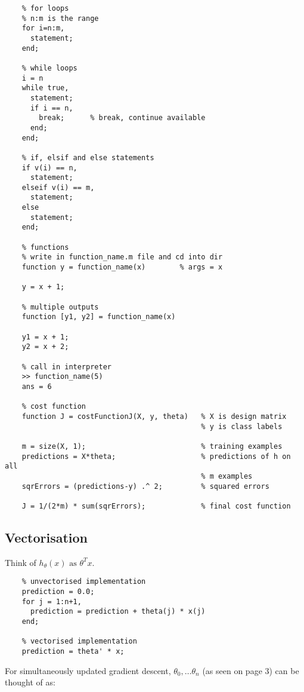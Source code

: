 \documentclass[12pt] {article}
\begin{document}
{    \begin{lstlisting}
    % for loops
    % n:m is the range
    for i=n:m,
      statement;
    end;

    % while loops
    i = n
    while true,
      statement;
      if i == n,
        break;      % break, continue available
      end;
    end;

    % if, elsif and else statements
    if v(i) == n,
      statement;
    elseif v(i) == m,
      statement;
    else
      statement;
    end;

    % functions
    % write in function_name.m file and cd into dir
    function y = function_name(x)        % args = x

    y = x + 1;

    % multiple outputs
    function [y1, y2] = function_name(x)

    y1 = x + 1;
    y2 = x + 2;

    % call in interpreter
    >> function_name(5)
    ans = 6

    % cost function
    function J = costFunctionJ(X, y, theta)   % X is design matrix
                                              % y is class labels

    m = size(X, 1);                           % training examples 
    predictions = X*theta;                    % predictions of h on all 
                                              % m examples
    sqrErrors = (predictions-y) .^ 2;         % squared errors

    J = 1/(2*m) * sum(sqrErrors);             % final cost function
    \end{lstlisting}
    \vspace{1em}

  \subsection{Vectorisation}

    Think of $h_\theta(x) \text{ as } \theta^Tx$.

    \begin{lstlisting}
    % unvectorised implementation
    prediction = 0.0;
    for j = 1:n+1,
      prediction = prediction + theta(j) * x(j)
    end;

    % vectorised implementation
    prediction = theta' * x;
    \end{lstlisting}
    
    For simultaneously updated gradient descent, $\theta_0, \dots \theta_n$
    (as seen on page 3) can be thought of as:

}
\end{document}
